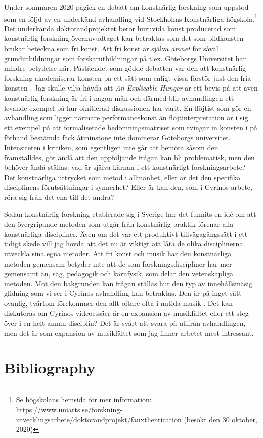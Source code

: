 \documentclass[11pt]{article}
\begin{document}
Under sommaren 2020 pågick en debatt om konstnärlig forskning som uppstod som en följd av en underkänd avhandling vid Stockholms Konstnärliga högskola.\footnote{Se högskolans hemsida för mer information: \url{https://www.uniarts.se/forskning-utvecklingsarbete/doktorandprojekt/fauxthentication} (besökt den 30 oktober, 2020)} Det underkända doktorandprojektet berör huruvida konst producerad som konstnärlig forskning överhuvudtaget kan betraktas som det som bildkonsten brukar beteckna som fri konst. Att fri konst är själva \emph{ämnet} för såväl grundutbildningar som forskarutbildningar på t.ex. Göteborgs Universitet har mindre betydelse här. Påståendet som gödde debatten var den att konstnärlig forskning akademiserar konsten på ett sätt som enligt vissa förstör just den fria konsten \citep[se till exempel ][]{petersson2020}. Jag skulle vilja hävda att \emph{An Explicable Hunger} är ett bevis på att även konstnärlig forskning är fri i någon mån och därmed blir avhandlingen ett levande exempel på hur oinitierad diskussionen har varit. En flöjtist som gör en avhandling som ligger närmare performancekonst än flöjtinterpretation är i sig ett exempel på att formaliserade bedömningsmatriser som tvingar in konsten i på förhand bestämda fack åtminstone inte dominerar Göteborgs universitet. Intensiteten i kritiken, som egentligen inte går att bemöta såsom den framställdes, gör ändå att den uppföljande frågan kan bli problematisk, men den behöver ändå ställas: vad är själva kärnan i ett konstnärligt forskningsarbete? Det konstnärliga uttrycket som metod i allmänhet, eller är det den specifika disciplinens förutsättningar i synnerhet? Eller är kan den, som i Cyrinos arbete, röra sig från det ena till det andra?

Sedan konstnärlig forskning etablerade sig i Sverige har det funnits
en idé om att den övergripande metoden som utgår från konstnärlig
praktik förenar alla konstnärliga discipliner. Även om det var ett
produktivt tillvägagångssätt i ett tidigt skede vill jag hövda att det
nu är viktigt att låta de olika disciplinerna utveckla sina egna
metoder. Att fri konst och musik har den konstnärliga metoden gemensam
betyder inte att de som forskningsdiscipliner har mer gemensamt än,
säg, pedagogik och kärnfysik, som delar den vetenskapliga metoden. Mot
den bakgrunden kan frågan ställas hur den typ av innehållsmäsig
glidning som vi ser i Cyrinos avhandling kan betraktas. Den är på
inget sätt ovanlig, tvärtom förekommer den allt oftare ofta i nutida
musik \citep{groth2016}. Det
kan diskuteras om Cyrinos videoessäer är en expansion av musikfältet
eller ett steg över i en helt annan disciplin? Det är svårt att svara
på utifrån avhandlingen, men det är som expansion av musikfältet som
jag finner arbetet mest intressant.

\section*{Bibliography}
\label{sec:org2ad5f4c}
\printbibliography
\end{document}
